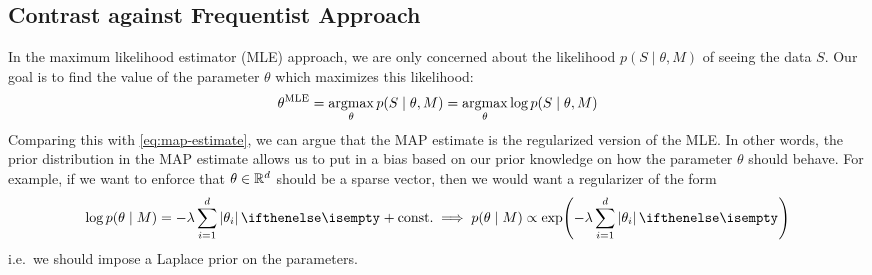 \subsection{Contrast against Frequentist Approach}

In the maximum likelihood estimator (MLE) approach, we are only concerned about
the likelihood $p(S \mid \theta, M)$ of seeing the data $S$. Our goal is to find
the value of the parameter $\theta$ which maximizes this likelihood:
\begin{equation}
  \theta^\text{MLE} = \operatorname*{argmax}_\theta p(S \mid \theta, M) = \operatorname*{argmax}_\theta \log
  p(S \mid \theta, M)
\end{equation}
Comparing this with \eqref{eq:map-estimate}, we can argue that the MAP estimate
is the regularized version of the MLE. In other words, the prior distribution in
the MAP estimate allows us to put in a bias based on our prior knowledge on how
the parameter $\theta$ should behave. For example, if we want to enforce that
$\theta \in \mathbb{R}^d$ should be a sparse vector, then we would want a regularizer
of the form
\begin{equation}
  \log p(\theta \mid M) = - \lambda \sum_{i = 1}^d \Abs{\theta_i} +
  \text{const.} \implies p(\theta \mid M) \propto \exp(-\lambda \sum_{i = 1}^d
  \Abs{\theta_i})
\end{equation}
i.e.\ we should impose a Laplace prior on the parameters.

%
